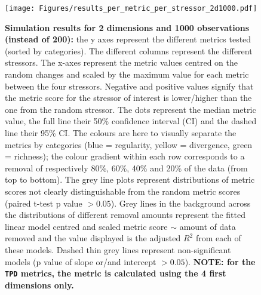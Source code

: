 \documentclass[12pt,letterpaper]{article}
\begin{document}
\begin{figure}[!htbp]
\centering
   \texttt{[image: Figures/results\_per\_metric\_per\_stressor\_2d1000.pdf]}
\caption{\scriptsize{\textbf{Simulation results for 2 dimensions and 1000 observations (instead of 200):} the y axes represent the different metrics tested (sorted by categories).
The different columns represent the different stressors. The x-axes represent the metric values centred on the random changes and scaled by the maximum value for each metric between the four stressors.
Negative and positive values signify that the metric score for the stressor of interest is lower/higher than the one from the random stressor.
The dots represent the median metric value, the full line their 50\% confidence interval (CI) and the dashed line their 95\% CI.
The colours are here to visually separate the metrics by categories (blue = regularity, yellow = divergence, green = richness); the colour gradient within each row corresponds to a removal of respectively 80\%, 60\%, 40\% and 20\% of the data (from top to bottom).
The grey line plots represent distributions of metric scores not clearly distinguishable from the random metric scores (paired t-test p value $> 0.05$).
Grey lines in the background across the distributions of different removal amounts represent the fitted linear model centred and scaled metric score $\sim$ amount of data removed and the value displayed is the adjusted $R^2$ from each of these models.
Dashed thin grey lines represent non-significant models (p value of slope or/and intercept $> 0.05$).
\textbf{NOTE: for the \texttt{TPD} metrics, the metric is calculated using the 4 first dimensions only.}
}}
\label{Fig:simulation_results_2d1000}
\end{figure}
\bigskip
\end{document}
